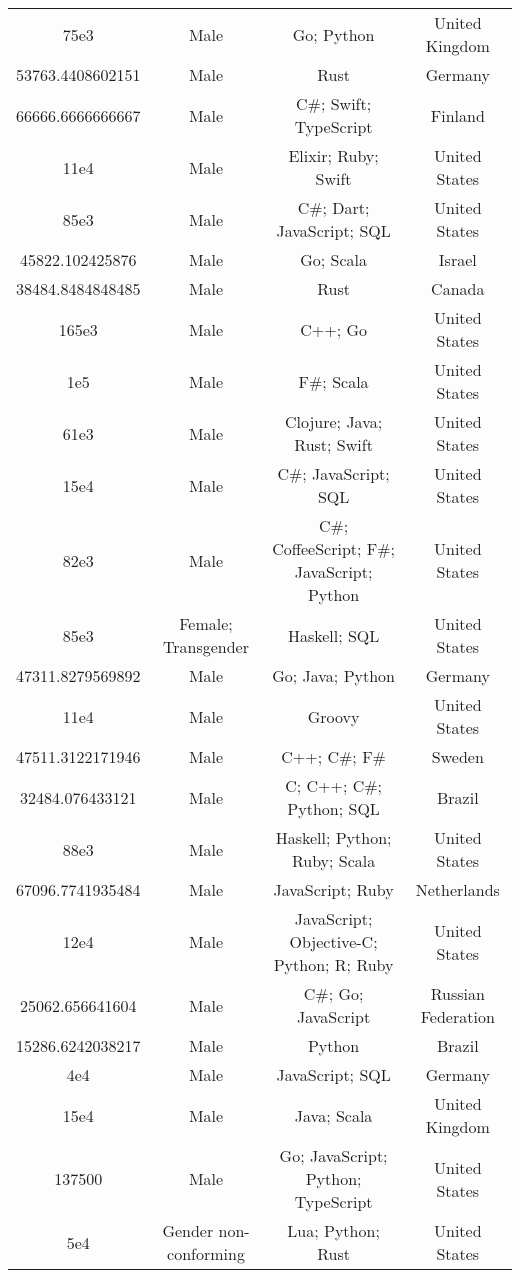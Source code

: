 \begin{center}
\begin{tabular}{ |c|c|c|c| }
75e3  &  Male  &  Go; Python  &  United Kingdom  \\ 
53763.4408602151  &  Male  &  Rust  &  Germany  \\ 
66666.6666666667  &  Male  &  C\#; Swift; TypeScript  &  Finland  \\ 
11e4  &  Male  &  Elixir; Ruby; Swift  &  United States  \\ 
85e3  &  Male  &  C\#; Dart; JavaScript; SQL  &  United States  \\ 
45822.102425876  &  Male  &  Go; Scala  &  Israel  \\ 
38484.8484848485  &  Male  &  Rust  &  Canada  \\ 
165e3  &  Male  &  C++; Go  &  United States  \\ 
1e5  &  Male  &  F\#; Scala  &  United States  \\ 
61e3  &  Male  &  Clojure; Java; Rust; Swift  &  United States  \\ 
15e4  &  Male  &  C\#; JavaScript; SQL  &  United States  \\ 
82e3  &  Male  &  C\#; CoffeeScript; F\#; JavaScript; Python  &  United States  \\ 
85e3  &  Female; Transgender  &  Haskell; SQL  &  United States  \\ 
47311.8279569892  &  Male  &  Go; Java; Python  &  Germany  \\ 
11e4  &  Male  &  Groovy  &  United States  \\ 
47511.3122171946  &  Male  &  C++; C\#; F\#  &  Sweden  \\ 
32484.076433121  &  Male  &  C; C++; C\#; Python; SQL  &  Brazil  \\ 
88e3  &  Male  &  Haskell; Python; Ruby; Scala  &  United States  \\ 
67096.7741935484  &  Male  &  JavaScript; Ruby  &  Netherlands  \\ 
12e4  &  Male  &  JavaScript; Objective-C; Python; R; Ruby  &  United States  \\ 
25062.656641604  &  Male  &  C\#; Go; JavaScript  &  Russian Federation  \\ 
15286.6242038217  &  Male  &  Python  &  Brazil  \\ 
4e4  &  Male  &  JavaScript; SQL  &  Germany  \\ 
15e4  &  Male  &  Java; Scala  &  United Kingdom  \\ 
137500  &  Male  &  Go; JavaScript; Python; TypeScript  &  United States  \\ 
5e4  &  Gender non-conforming  &  Lua; Python; Rust  &  United States  \\ 

\end{tabular}
\end{center}
